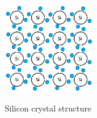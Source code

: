 





\begin{figure}
\vspace*{-.4in}
\centering
\caption{Silicon crystal structure}
\includegraphics[width=0.35\textwidth]{semiconductors_pure}\label{f-semiconductor-pure}
\end{figure}

